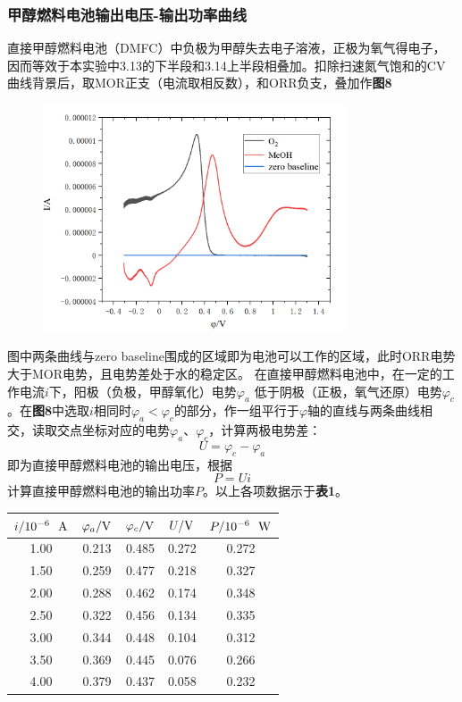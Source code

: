 \documentclass[12pt]{article}
\begin{document}
			\subsubsection{甲醇燃料电池输出电压-输出功率曲线}
			直接甲醇燃料电池（DMFC）中负极为甲醇失去电子溶液，正极为氧气得电子，因而等效于本实验中3.13的下半段和3.14上半段相叠加。扣除扫速氮气饱和的CV曲线背景后，取MOR正支（电流取相反数），和ORR负支，叠加作\textbf{图8}
			\begin{figure}[h]
				\centering
				\includegraphics[width=0.8\textwidth]{8.png}
			\end{figure}
			\par
			图中两条曲线与zero baseline围成的区域即为电池可以工作的区域，此时ORR电势大于MOR电势，且电势差处于水的稳定区。
			在直接甲醇燃料电池中，在一定的工作电流$i$下，阳极（负极，甲醇氧化）电势$\varphi_{a}$
			低于阴极（正极，氧气还原）电势$\varphi_{c}$。在\textbf{图8}中选取$i$相同时$\varphi_{a}<\varphi_{c}$的部分，作一组平行于$\varphi$轴的直线与两条曲线相交，读取交点坐标对应的电势$\varphi_{a}$、$\varphi_{c}$，计算两极电势差：
			$$
			U=\varphi_{c}-\varphi_{a}
			$$
			即为直接甲醇燃料电池的输出电压，根据
			$$
			P=Ui
			$$
			计算直接甲醇燃料电池的输出功率$P$。以上各项数据示于\textbf{表1}。
			\begin{table}[h]
				\centering
				\begin{tabular}{ccccc}
					\toprule
					$i/{\rm 10^{-6}\ \ A}$ & $\varphi_{a}/{\rm V}$ & $\varphi_{c}/{\rm V}$ & $U/{\rm V}$ & $P/{\rm 10^{-6}\ \ W}$ \\
					\midrule
				1.00 & 0.213 & 0.485 & 0.272 & 0.272 \\
				1.50 & 0.259 & 0.477 & 0.218 & 0.327 \\
				2.00 & 0.288 & 0.462 & 0.174 & 0.348 \\
				2.50 & 0.322 & 0.456 & 0.134 & 0.335 \\
				3.00 & 0.344 & 0.448 & 0.104 & 0.312 \\
				3.50 & 0.369 & 0.445 & 0.076 & 0.266 \\
				4.00 & 0.379 & 0.437 & 0.058 & 0.232 \\
					\bottomrule
				\end{tabular}
			\end{table}
\end{document}
